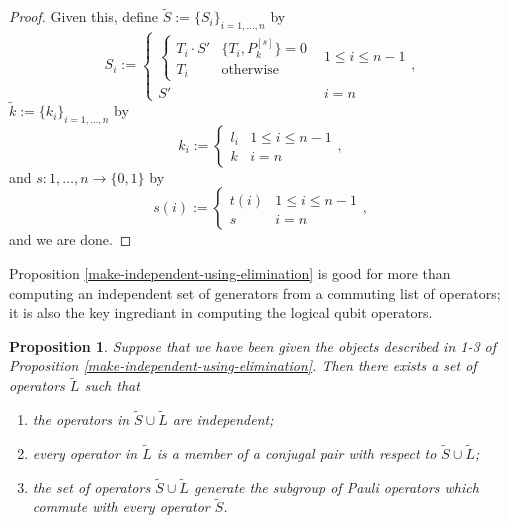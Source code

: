 \documentclass[twocolumn,showpacs,preprintnumbers,amsmath,amssymb,nofootinbib,pra,floatfix]{revtex4}
\newtheorem{proposition}{Proposition}
\newenvironment{remark}[1][Remark]{\begin{trivlist}
\item[\hskip \labelsep {\bfseries #1}]}{\end{trivlist}}
\newcommand{\set}{\tilde}
\begin{document}
\begin{proof}
Given this, define $\set S := \{S_i\}_{i=1,\dots,n}$ by 
$$S_i := 
\begin{cases}
\begin{cases}
T_i \cdot S' & \{T_i,P_k^{[s]}\}=0 \\
T_i & \text{otherwise}
\end{cases} & 1\le i\le n-1 \\
S' & i=n
\end{cases},
$$ $\set k:=\{k_i\}_{i=1,\dots,n}$ by
$$
k_i :=
\begin{cases}
l_i & 1 \le i \le n-1 \\
k & i=n
\end{cases},
$$ and $s:1,\dots,n\to \{0,1\}$ by
$$
s(i):=
\begin{cases}
t(i) & 1 \le i \le n-1\\
s & i=n
\end{cases},
$$ and we are done.
\end{proof}
\begin{remark}
Proposition \ref{make-independent-using-elimination} is good for more than computing an independent set of generators from a commuting list of operators;  it is also the key ingrediant in computing the logical qubit operators.
\end{remark}

\begin{proposition}
\label{construction-of-logicals}
Suppose that we have been given the objects described in 1-3 of Proposition \ref{make-independent-using-elimination}.  Then there exists a set of operators $\set L$ such that
\begin{enumerate}
\item \label{L-are-independent} the operators in $\set S\cup\set L$ are independent;
\item \label{L-are-conjugal-pairs} every operator in $\set L$ is a member of a conjugal pair with respect to $\set S\cup\set L$;
\item \label{L-completes-the-generators} the set of operators $\set S\cup\set L$ generate the subgroup of Pauli operators which commute with every operator $\set S$.
\end{enumerate}
\end{proposition}
\end{document}
